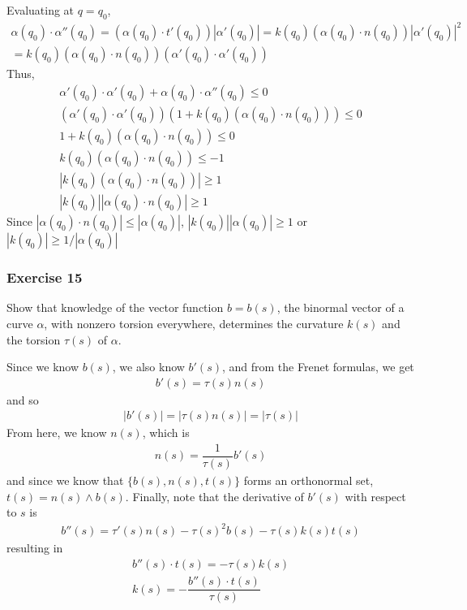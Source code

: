\documentclass{article}
\begin{document}
	Evaluating at $q = q_0$,
	\begin{gather*}
		\alpha(q_0) \cdot \alpha''(q_0) = \left( \alpha(q_0) \cdot t'(q_0) \right) |\alpha'(q_0)| = k(q_0) \left( \alpha(q_0) \cdot n(q_0) \right) |\alpha'(q_0)|^2 \\
		= k(q_0) \left( \alpha(q_0) \cdot n(q_0) \right) \left( \alpha'(q_0) \cdot \alpha'(q_0) \right)
	\end{gather*}
	Thus,
	\begin{gather*}
		\alpha'(q_0) \cdot \alpha'(q_0) + \alpha(q_0) \cdot \alpha''(q_0) \leq 0 \\
		\left( \alpha'(q_0) \cdot \alpha'(q_0) \right) \left( 1 + k(q_0) \left( \alpha(q_0) \cdot n(q_0) \right) \right) \leq 0 \\
		1 + k(q_0) \left( \alpha(q_0) \cdot n(q_0) \right) \leq 0 \\
		k(q_0) \left( \alpha(q_0) \cdot n(q_0) \right) \leq -1	\\
		|k(q_0) \left( \alpha(q_0) \cdot n(q_0) \right)| \geq 1	\\
		|k(q_0)| |\alpha(q_0) \cdot n(q_0)| \geq 1
	\end{gather*}
	Since $|\alpha(q_0) \cdot n(q_0)| \leq |\alpha(q_0)|$, $|k(q_0)| |\alpha(q_0)| \geq 1$ or $|k(q_0)| \geq 1/|\alpha(q_0)|$
	
	\subsubsection*{Exercise 15}
	Show that knowledge of the vector function $b = b(s)$, the binormal vector of a curve $\alpha$, with nonzero torsion everywhere, determines the curvature $k(s)$ and the torsion $\tau(s)$ of $\alpha$.
	
	Since we know $b(s)$, we also know $b'(s)$, and from the Frenet formulas, we get 
	\begin{gather*}
		b'(s) = \tau(s) n(s)
	\end{gather*}
	and so
	\begin{gather*}
		|b'(s)| = |\tau(s) n(s)| = |\tau(s)|
	\end{gather*}
	From here, we know $n(s)$, which is
	\begin{gather*}
		n(s) = \dfrac{1}{\tau(s)} b'(s)
	\end{gather*}
	and since we know that $\{b(s), n(s), t(s)\}$ forms an orthonormal set, $t(s) = n(s) \wedge b(s)$. Finally, note that the derivative of $b'(s)$ with respect to $s$ is
	\begin{gather*}
		b''(s) = \tau'(s) n(s) - \tau(s)^2 b(s) - \tau(s) k(s) t(s)
	\end{gather*}
	resulting in
	\begin{gather*}
		b''(s) \cdot t(s) = - \tau(s) k(s) \\
		k(s) = - \dfrac{b''(s) \cdot t(s)}{\tau(s)}
	\end{gather*}
	
\end{document}
